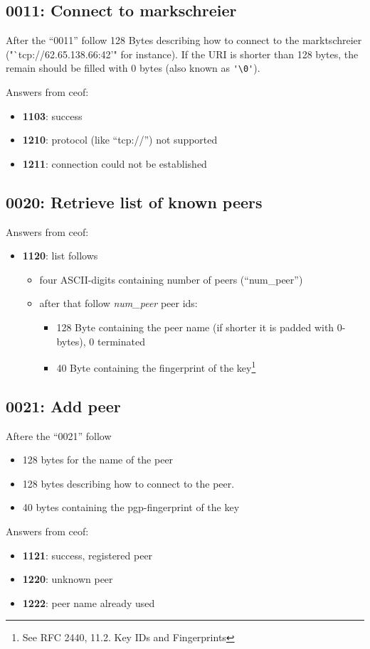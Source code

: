 \documentclass[12pt,a4paper]{book}
\begin{document}
\subsection{0011: Connect to markschreier}
After the "`0011"' follow 128 Bytes describing how to connect
to the marktschreier ("`tcp://62.65.138.66:42'" for instance).
If the URI is shorter than 128 bytes, the remain should be filled with 0 bytes
(also known as \verb='\0'=).

Answers from ceof:
\begin{itemize}
\item \textbf{1103}: success
\item \textbf{1210}: protocol (like "`tcp://"') not supported
\item \textbf{1211}: connection could not be established
\end{itemize}
\subsection{0020: Retrieve list of known peers}
Answers from ceof:
\begin{itemize}
\item \textbf{1120}: list follows
\begin{itemize}
\item four ASCII-digits containing number of peers ("`num\_peer"')
\item after that follow \textit{num\_peer} peer ids:
\begin{itemize}
\item 128 Byte containing the peer name (if shorter it is padded with 0-bytes), 0 terminated
\item 40 Byte containing the fingerprint of the
key\footnote{See RFC 2440, 11.2. Key IDs and Fingerprints}
\end{itemize}
\end{itemize}
\end{itemize}
\subsection{0021: Add peer}
Aftere the "`0021"' follow

\begin{itemize}
\item 128 bytes for the name of the peer
\item 128 bytes describing how to connect to the peer.
\item 40 bytes  containing the pgp-fingerprint of the key
\end{itemize}
Answers from ceof:
\begin{itemize}
\item \textbf{1121}: success, registered peer
\item \textbf{1220}: unknown peer
\item \textbf{1222}: peer name already used
\end{itemize}
\end{document}
